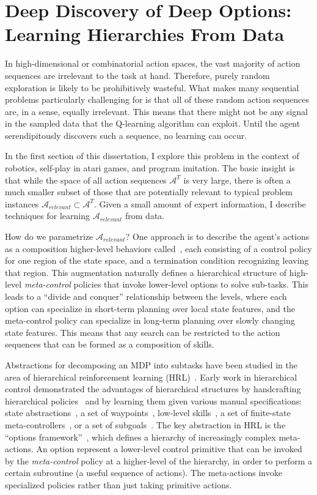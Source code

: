 \chapter{Deep Discovery of Deep Options: Learning Hierarchies From Data}
\setcounter{secnumdepth}{1}
In high-dimensional or combinatorial action spaces, the vast majority of action sequences are irrelevant to the task at hand.
Therefore, purely random exploration is likely to be prohibitively wasteful.
What makes many sequential problems particularly challenging for is that all of these random action sequences are, in a sense, equally irrelevant. 
This means that there might not be any signal in the sampled data that the Q-learning algorithm can exploit.
Until the agent serendipitously discovers such a sequence, no learning can occur.

In the first section of this dissertation, I explore this problem in the context of robotics, self-play in atari games, and program imitation. 
The basic insight is that while the space of all action sequences $\mathcal{A}^T$ is very large, there is often a much smaller subset of those that are potentially relevant to typical problem instances $\mathcal{A}_{relevant} \subset \mathcal{A}^T$. 
Given a small amount of expert information, I describe techniques for learning $\mathcal{A}_{relevant}$ from data.

How do we parametrize $\mathcal{A}_{relevant}$?
One approach is to describe the agent's actions as a composition higher-level behaviors called~\cite{suttonPS99}, each consisting of a control policy for one region of the state space, and a termination condition recognizing leaving that region. This augmentation naturally defines a hierarchical structure of high-level \emph{meta-control} policies that invoke lower-level options to solve sub-tasks.
This leads to a ``divide and conquer'' relationship between the levels, where each option can specialize in short-term planning over local state features, and the meta-control policy can specialize in long-term planning over slowly changing state features.
This means that any search can be restricted to the action sequences that can be formed as a composition of skills.

Abstractions for decomposing an MDP into subtasks have been studied in the area of hierarchical reinforcement learning (HRL)~\cite{parr98,suttonPS99,barto03}.
Early work in hierarchical control demonstrated the advantages of hierarchical structures by handcrafting hierarchical policies~\cite{brooks1986robust} and by learning them given various manual specifications: state abstractions~\cite{dayanH92,hengst02,kolterAN07,konidarisB07}, a set of waypoints~\cite{kaelbling93}, low-level skills~\cite{huberG97,baconP15,liaw17composing}, a set of finite-state meta-controllers~\cite{parrR97}, or a set of subgoals~\cite{suttonPS99,dietterich00}.
The key abstraction in HRL is the ``options framework''~\cite{suttonPS99}, which defines a hierarchy of increasingly complex meta-actions.
 An option represent a lower-level control primitive that can be invoked by the \emph{meta-control} policy at a higher-level of the hierarchy, in order to perform a certain subroutine (a useful sequence of actions).
The meta-actions invoke specialized policies rather than just taking primitive actions.

